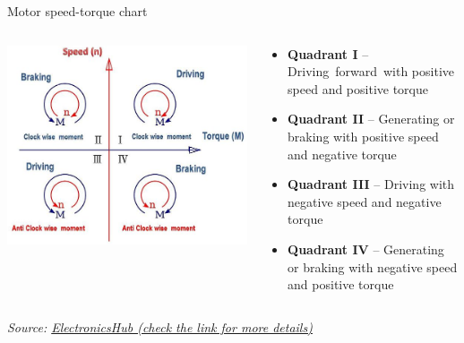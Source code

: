 \documentclass[compress]{beamer}
\newcommand{\source}[2]{{\tiny\it Source: \href{#1}{#2}}}
\begin{document}
\begin{frame}{Motor speed-torque chart}

    \begin{columns}
        \begin{column}{0.4\linewidth}
    \begin{center}
        \includegraphics[width=1.1\columnwidth]{four-quadrant}
    \end{center}
            
        \end{column}
        \begin{column}{0.6\linewidth}
    \begin{itemize}
        \item \textbf{Quadrant I} -- Driving forward with positive speed and positive torque
        \item \textbf{Quadrant II} -- Generating or braking with positive speed
            and negative torque

        \item \textbf{Quadrant III} -- Driving with negative speed and negative torque
        \item \textbf{Quadrant IV} -- Generating or braking with negative speed
            and positive torque

    \end{itemize}

        \end{column}
    \end{columns}


    \source{http://www.electronicshub.org/four-quadrant-operations-of-dc-motor/}{ElectronicsHub
    (check the link for more details)}
\end{frame}
\end{document}
